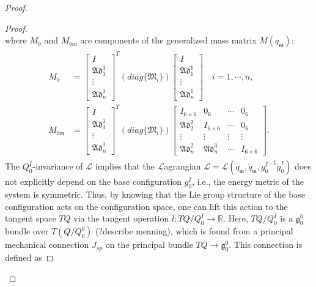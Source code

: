 \documentclass[lettersize,journal]{IEEEtran}
\def \R  {\mathbb{R}}
\def \g  {\mathfrak{g}}
\def \Add {\mathfrak{Ad}}
\def \L {\mathcal{L}}
\begin{document}
\begin{proof}[Proof]
\begin{proof}[Proof]
\begin{equation}
\end{equation}
where $M_0$ and $M_{bm}$ are components of the generalized mass matrix $M(q_\mathfrak{m})$:
\begin{align}
\begin{split}
  M_0&=\begin{bmatrix}I\\\Add_1^1\\ \vdots \\ \Add^1_n \end{bmatrix} ^T(diag\{\mathfrak{M}_i\})\begin{bmatrix}I\\\Add_1^1\\ \vdots \\ \Add^1_n \end{bmatrix} \quad i=1,\cdots,n,\\%
  M_{0\mathfrak{m}}&=\begin{bmatrix}I\\\Add_1^1\\ \vdots \\ \Add^1_n \end{bmatrix} ^T(diag\{\mathfrak{M}_i\})\begin{bmatrix} I_{6\times6}&0_6&\cdots&0_6\\ \Add^2_2 &I_{6\times6}&\cdots&0_6\\ \vdots &\vdots & \vdots &\vdots\\ \Add^2_n &\Add^3_n&\cdots&I_{6\times6} \end{bmatrix}.
\end{split}
\end{align}
The $Q^I_0$-invariance of $\mathcal{L}$ implies that the $\L$agrangian $\mathcal{L} = \mathcal{L}(q_\mathfrak{m}, \dot{q}_\mathfrak{m},{g^I_0}^{-1}\dot{g}^I_0)$ does not explicitly depend on the base configuration $g^I_0$, i.e., the energy metric of the system is symmetric. %
Thus, by knowing that the Lie group structure of the base configuration acts on the configuration space, one can lift this action to the tangent space $TQ$ via the tangent operation %
$l:TQ/Q_0^I\rightarrow\R$. Here, $TQ/Q_0^I$ is a $\g^0_0$ bundle over $T(Q/Q^0_0)$ (?describe meaning), which is found from a principal mechanical connection $J_{sp}$ on the principal bundle $TQ\rightarrow \g^0_0$. This connection is defined as

\end{proof}
\end{proof}
\end{document}
